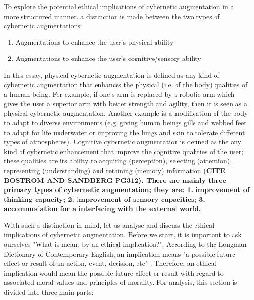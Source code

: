 To explore the potential ethical implications of cybernetic augmentation in a more structured manner, a distinction is made between the two types of cybernetic augmentations: 
\begin{enumerate}
	\item Augmentations to enhance the user's physical ability
	\item Augmentations to enhance the user's cognitive/sensory ability
\end{enumerate}

In this essay, physical cybernetic augmentation is defined as any kind of cybernetic augmentation that enhances the physical (i.e. of the body) qualities of a human being. For example, if one's arm is replaced by a robotic arm which gives the user a superior arm with better strength and agility, then it is seen as a physical cybernetic augmentation. Another example is a modification of the body to adapt to diverse environments (e.g. giving human beings gills and webbed feet to adapt for life underwater or improving the lungs and skin to tolerate different types of atmospheres). Cognitive cybernetic augmentation is defined as the any kind of cybernetic enhancement that improve the cognitive qualities of the user; these qualities are its ability to acquiring (perception), selecting (attention), representing (understanding) and retaining (memory) information (\bf{CITE BOSTROM AND SANDBERG PG312}). There are mainly three primary types of cybernetic augmentation; they are: 1. improvement of thinking capacity; 2. improvement of sensory capacities; 3. accommodation for a interfacing with the external world. 


With such a distinction in mind, let us analyse and discuss the ethical implications of cybernetic augmentation. Before we start, it is important to ask ourselves "What is meant by an ethical implication?". According to the Longman Dictionary of Contemporary English, an implication means "a possible future effect or result of an action, event, decision, etc" \cite{Longman_dic}. Therefore, an ethical implication would mean the possible future effect or result with regard to associated moral values and principles of morality. For analysis, this section is divided into three main parts: 

